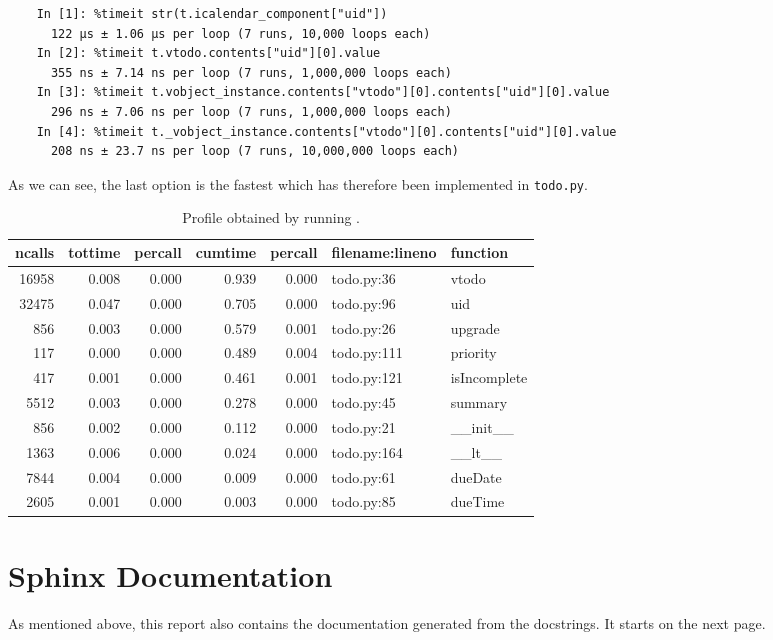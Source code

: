 \documentclass{prettytex/ox/mmsc-special-topic}
\begin{document}
  \begin{verbatim}
    In [1]: %timeit str(t.icalendar_component["uid"])
      122 µs ± 1.06 µs per loop (7 runs, 10,000 loops each)
    In [2]: %timeit t.vtodo.contents["uid"][0].value
      355 ns ± 7.14 ns per loop (7 runs, 1,000,000 loops each)
    In [3]: %timeit t.vobject_instance.contents["vtodo"][0].contents["uid"][0].value
      296 ns ± 7.06 ns per loop (7 runs, 1,000,000 loops each)
    In [4]: %timeit t._vobject_instance.contents["vtodo"][0].contents["uid"][0].value
      208 ns ± 23.7 ns per loop (7 runs, 10,000,000 loops each)
  \end{verbatim}

  As we can see, the last option is the fastest which has therefore been implemented in \texttt{todo.py}.

  \begin{table}[H]
    \centering
    \caption{Profile obtained by running .}
    \begin{tabular}{rrrrrll}
      \hline
      ncalls & tottime & percall & cumtime & percall & filename:lineno & function     \\
      \hline
      16958  & 0.008   & 0.000   & 0.939   & 0.000   & todo.py:36      & vtodo        \\
      32475  & 0.047   & 0.000   & 0.705   & 0.000   & todo.py:96      & uid          \\
      856    & 0.003   & 0.000   & 0.579   & 0.001   & todo.py:26      & upgrade      \\
      117    & 0.000   & 0.000   & 0.489   & 0.004   & todo.py:111     & priority     \\
      417    & 0.001   & 0.000   & 0.461   & 0.001   & todo.py:121     & isIncomplete \\
      5512   & 0.003   & 0.000   & 0.278   & 0.000   & todo.py:45      & summary      \\
      856    & 0.002   & 0.000   & 0.112   & 0.000   & todo.py:21      & \_\_init\_\_ \\
      1363   & 0.006   & 0.000   & 0.024   & 0.000   & todo.py:164     & \_\_lt\_\_   \\
      7844   & 0.004   & 0.000   & 0.009   & 0.000   & todo.py:61      & dueDate      \\
      2605   & 0.001   & 0.000   & 0.003   & 0.000   & todo.py:85      & dueTime      \\
    \end{tabular}
    \label{table:paint-profile}
  \end{table}

  \section{Sphinx Documentation}
  As mentioned above, this report also contains the documentation generated from the docstrings. It starts on the next page.

  
\end{document}
